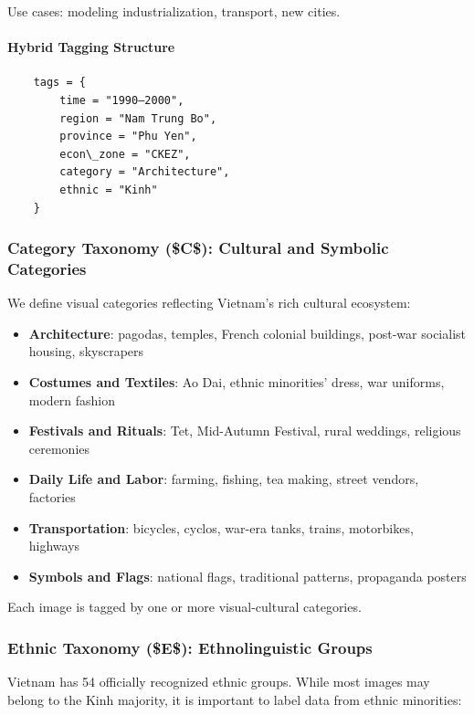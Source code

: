 \documentclass[conference]{IEEEtran}
\begin{document}
Use cases: modeling industrialization, transport, new cities.

\paragraph{Hybrid Tagging Structure}

\begin{verbatim}
	tags = {
		time = "1990–2000",
		region = "Nam Trung Bo",
		province = "Phu Yen",
		econ\_zone = "CKEZ",
		category = "Architecture",
		ethnic = "Kinh"
	}
\end{verbatim}

\subsubsection{Category Taxonomy (\$C\$): Cultural and Symbolic Categories}

We define visual categories reflecting Vietnam's rich cultural ecosystem:

\begin{itemize}
	\item \textbf{Architecture}: pagodas, temples, French colonial buildings, post-war socialist housing, skyscrapers
	\item \textbf{Costumes and Textiles}: Ao Dai, ethnic minorities’ dress, war uniforms, modern fashion
	\item \textbf{Festivals and Rituals}: Tet, Mid-Autumn Festival, rural weddings, religious ceremonies
	\item \textbf{Daily Life and Labor}: farming, fishing, tea making, street vendors, factories
	\item \textbf{Transportation}: bicycles, cyclos, war-era tanks, trains, motorbikes, highways
	\item \textbf{Symbols and Flags}: national flags, traditional patterns, propaganda posters
\end{itemize}

Each image is tagged by one or more visual-cultural categories.

\subsubsection{Ethnic Taxonomy (\$E\$): Ethnolinguistic Groups}

Vietnam has 54 officially recognized ethnic groups. While most images may belong to the Kinh majority, it is important to label data from ethnic minorities:
\end{document}
